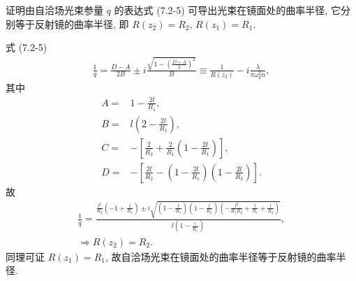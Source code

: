 \documentclass{note}
\begin{document}
\begin{exe}
    证明由自洽场光束参量 $q$ 的表达式 (7.2-5) 可导出光束在镜面处的曲率半径, 它分别等于反射镜的曲率半径, 即 $R(z_2)=R_2$, $R(z_1)=R_1$.
\end{exe}
\begin{pf}
    式 (7.2-5)
    \begin{align}
        \frac{1}{q}=\frac{D-A}{2B}\pm i\frac{\sqrt{1-\left(\frac{D+A}{2}\right)^2}}{B}\equiv\frac{1}{R(z_2)}-i\frac{\lambda}{\pi\omega_2^2n},
    \end{align}
    其中
    \begin{align}
        A=&1-\frac{2l}{R_1},\\
        B=&l\left(2-\frac{2l}{R_1}\right),\\
        C=&-\left[\frac{2}{R_2}+\frac{2}{R_1}\left(1-\frac{2l}{R_1}\right)\right],\\
        D=&-\left[\frac{2l}{R_2}-\left(1-\frac{2l}{R_1}\right)\left(1-\frac{2l}{R_2}\right)\right].
    \end{align}
    故
    \begin{gather}
        \frac{1}{q}=\frac{\frac{l^2}{R_2}\left(-1+\frac{l}{R_1}\right)\pm i\sqrt{\left(1-\frac{l}{R_1}\right)\left(1-\frac{l}{R_2}\right)\left(-\frac{l^2}{R_1R_2}+\frac{l}{R_1}+\frac{l}{R_2}\right)}}{l\left(1-\frac{l}{R_1}\right)},\\
        \Longrightarrow R(z_2)=R_2.
    \end{gather}
    同理可证 $R(z_1)=R_1$, 故自洽场光束在镜面处的曲率半径等于反射镜的曲率半径.
\end{pf}
\end{document}

